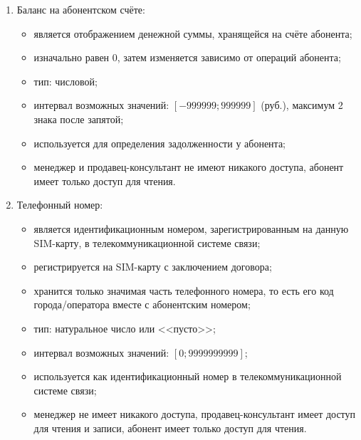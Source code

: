 \begin{enumerate}
\begin{enumerate}
        \item Баланс на абонентском счёте:
        \begin{itemize}
            \item является отображением денежной суммы, хранящейся на счёте абонента;
            \item изначально равен 0, затем изменяется зависимо от операций абонента;
            \item тип: числовой;
            \item интервал возможных значений: $[-999 999; 999 999]$ (руб.), максимум 2 знака после запятой; %
            \item используется для определения задолженности у абонента;
            \item менеджер и продавец-консультант не имеют никакого доступа, абонент имеет только доступ для чтения.
        \end{itemize}

        \item Телефонный номер:
        \begin{itemize}
            \item является идентификационным номером, зарегистрированным на данную SIM-карту, в телекоммуникационной системе связи;
            \item регистрируется на SIM-карту с заключением договора;
            \item хранится только значимая часть телефонного номера, то есть его код города/оператора вместе с абонентским номером; 
            \item тип: натуральное число или <<пусто>>;
            \item интервал возможных значений: $[0; 9 999 999 999]$;
            \item используется как идентификационный номер в телекоммуникационной системе связи;
            \item менеджер не имеет никакого доступа, продавец-консультант имеет доступ для чтения и записи, абонент имеет только доступ для чтения.
        \end{itemize}


\end{enumerate}
\end{enumerate}
